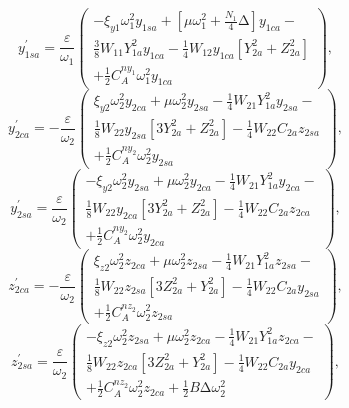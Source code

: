 \documentclass[review]{elsarticle}
\begin{document}
\begin{equation} \label{GrindEQ__40_} 
y^{'}_{1sa}=\frac{\varepsilon }{{\omega }_1}\left( \begin{array}{c}
-{\xi }_{y1}{\omega }^2_1y_{1sa}+\left[\mu {\omega }^2_1+\frac{N_1}{4}\mathrm{\Delta }\right]y_{1ca}- \\ 
\frac{3}{8}W_{11}Y^2_{1a}y_{1ca}-\frac{1}{4}W_{12}y_{1ca}\left[Y^2_{2a}+Z^2_{2a}\right] \\ 
+\frac{1}{2}C^{ny_1}_A{\omega }^2_1y_{1ca} \end{array}
\right),              
\end{equation} 
\begin{equation} \label{GrindEQ__41_} 
y^{'}_{2ca}=-\frac{\varepsilon }{{\omega }_2}\left( \begin{array}{c}
{\xi }_{y2}{\omega }^2_2y_{2ca}+\mu {\omega }^2_2y_{2sa}-\frac{1}{4}W_{21}Y^2_{1a}y_{2sa}- \\ 
\frac{1}{8}W_{22}y_{2sa}\left[3Y^2_{2a}+Z^2_{2a}\right]-\frac{1}{4}W_{22}C_{2a}z_{2sa} \\ 
+\frac{1}{2}C^{ny_2}_A{\omega }^2_2y_{2sa} \end{array}
\right),   
\end{equation} 
\begin{equation} \label{GrindEQ__42_} 
y^{'}_{2sa}=\frac{\varepsilon }{{\omega }_2}\left( \begin{array}{c}
-{\xi }_{y2}{\omega }^2_2y_{2sa}+\mu {\omega }^2_2y_{2ca}-\frac{1}{4}W_{21}Y^2_{1a}y_{2ca}- \\ 
\frac{1}{8}W_{22}y_{2ca}\left[{3Y}^2_{2a}+Z^2_{2a}\right]-\frac{1}{4}W_{22}C_{2a}z_{2ca} \\ 
+\frac{1}{2}C^{ny_2}_A{\omega }^2_2y_{2ca} \end{array}
\right),   
\end{equation} 
\begin{equation} \label{GrindEQ__43_} 
z^{'}_{2ca}=-\frac{\varepsilon }{{\omega }_2}\left( \begin{array}{c}
{\xi }_{z2}{\omega }^2_2z_{2ca}+\mu {\omega }^2_2z_{2sa}-\frac{1}{4}W_{21}Y^2_{1a}z_{2sa}- \\ 
\frac{1}{8}W_{22}z_{2sa}\left[3Z^2_{2a}+Y^2_{2a}\right]-\frac{1}{4}W_{22}C_{2a}y_{2sa} \\ 
+\frac{1}{2}C^{nz_2}_A{\omega }^2_2z_{2sa} \end{array}
\right),    
\end{equation} 
\begin{equation} \label{GrindEQ__44_} 
z^{'}_{2sa}=\frac{\varepsilon }{{\omega }_2}\left( \begin{array}{c}
-{\xi }_{z2}{\omega }^2_2z_{2sa}+\mu {\omega }^2_2z_{2ca}-\frac{1}{4}W_{21}Y^2_{1a}z_{2ca}- \\ 
\frac{1}{8}W_{22}z_{2ca}\left[{3Z}^2_{2a}+Y^2_{2a}\right]-\frac{1}{4}W_{22}C_{2a}y_{2ca} \\ 
+\frac{1}{2}C^{nz_2}_A{\omega }^2_2z_{2ca}+\frac{1}{2}B\mathrm{\Delta }{\omega }^2_2 \end{array}
\right),     
\end{equation} 
\end{document}
